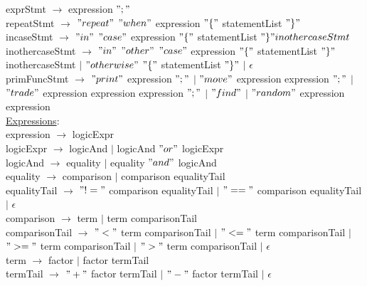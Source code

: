 \documentclass{article}
\begin{document}
exprStmt $\rightarrow$ expression $";"$ \\

repeatStmt $\rightarrow$ $"repeat"$  $"when"$  expression $"\{"$ statementList  $"\}"$ \\

incaseStmt $\rightarrow$  $"in"$  $"case"$ expression $"\{"$ statementList  $"\}" inothercaseStmt$\\

inothercaseStmt $\rightarrow$  $"in"$ $"other"$  $"case"$ expression $"\{"$ statementList  $"\}"$ inothercaseStmt $\vert$ $"otherwise"$ $"\{"$ statementList  $"\}"$ $\vert$ $\epsilon$ \\  

primFuncStmt $\rightarrow$ $"print"$ expression $";"$  $\vert$ $"move"$ expression expression $";"$ $\vert$ $"trade"$ expression expression expression $";"$ $\vert$ $"find"$ $\vert$ $"random"$ expression expression \\

\underline{Expressions}: \\

expression $\rightarrow$ logicExpr \\

logicExpr $\rightarrow$ logicAnd  $\vert$ logicAnd $"or"$ logicExpr \\

logicAnd $\rightarrow$ equality $\vert$ equality $"and"$ logicAnd \\

equality $\rightarrow$ comparison $\vert$ comparison equalityTail \\

equalityTail $\rightarrow$ $"!="$ comparison equalityTail $\vert$ $"=="$ comparison equalityTail $\vert$ $\epsilon$ \\

comparison $\rightarrow$ term $\vert$ term comparisonTail \\

comparisonTail $\rightarrow$ $"<"$ term comparisonTail $\vert$ $"<="$ term comparisonTail $\vert$ $">="$ term comparisonTail $\vert$ $">"$ term comparisonTail $\vert$ $\epsilon$ \\

term $\rightarrow$ factor $\vert$ factor termTail \\

termTail $\rightarrow$ $"+"$ factor termTail $\vert$ $"-"$ factor termTail $\vert$ $\epsilon$ \\
\end{document}
